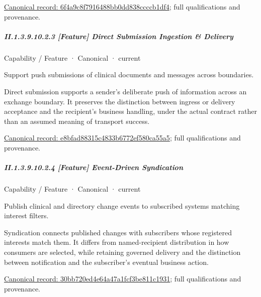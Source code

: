 {\footnotesize \href{../../../../../../../continuum/strategy/capability/feature/6f4a9c8f7916488bb0dd838ccccb1df4.md}{Canonical record: 6f4a9c8f7916488bb0dd838ccccb1df4}; full qualifications and provenance.}\par
\subparagraph*{II.1.3.9.10.2.3 [Feature] Direct Submission Ingestion \& Delivery}
\label{navigation:II.1.3.9.10.2.3}

\label{element:e8bfad88315c4833b6772ef580ca55a5}
{\small Capability / Feature · Canonical · current}\par

Support push submissions of clinical documents and messages across boundaries.



Direct submission supports a sender's deliberate push of information across an exchange boundary. It preserves the distinction between ingress or delivery acceptance and the recipient's business handling, under the actual contract rather than an assumed meaning of transport success.


{\footnotesize \href{../../../../../../../continuum/strategy/capability/feature/e8bfad88315c4833b6772ef580ca55a5.md}{Canonical record: e8bfad88315c4833b6772ef580ca55a5}; full qualifications and provenance.}\par
\subparagraph*{II.1.3.9.10.2.4 [Feature] Event-Driven Syndication}
\label{navigation:II.1.3.9.10.2.4}

\label{element:30bb720ed4e64a47a1fcf3be811c1931}
{\small Capability / Feature · Canonical · current}\par

Publish clinical and directory change events to subscribed systems matching interest filters.



Syndication connects published changes with subscribers whose registered interests match them. It differs from named-recipient distribution in how consumers are selected, while retaining governed delivery and the distinction between notification and the subscriber's eventual business action.


{\footnotesize \href{../../../../../../../continuum/strategy/capability/feature/30bb720ed4e64a47a1fcf3be811c1931.md}{Canonical record: 30bb720ed4e64a47a1fcf3be811c1931}; full qualifications and provenance.}\par
